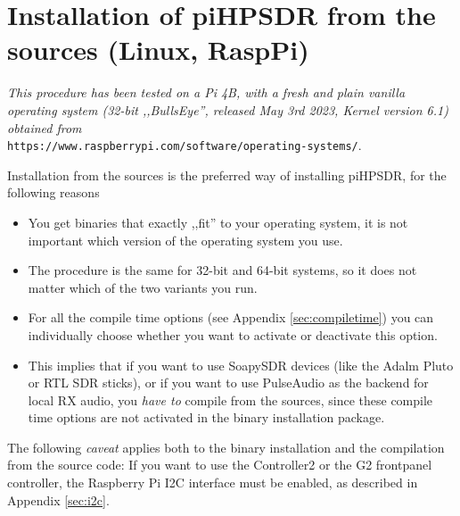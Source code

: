 \documentclass[12pt]{book}
\begin{document}
\chapter[Linux: piHPDSR install from sources]{Installation of piHPSDR from the sources (Linux, RaspPi)}
\label{sec:installsources}
\textit{This procedure has been tested on a Pi 4B, with a fresh and plain vanilla operating
system (32-bit ,,BullsEye'', released May 3rd 2023, Kernel version 6.1) obtained from} \\
\texttt{https://www.raspberrypi.com/software/operating-systems/}.

Installation from the sources is the preferred way of installing piHPSDR, for the following reasons

\begin{itemize}
\item{You get binaries that exactly ,,fit'' to your operating system, it is not important which version
of the operating system you use.}
\item{The procedure is the same for 32-bit and 64-bit systems, so it does not matter
which of the two variants you run.}
\item{For all the compile time options (see Appendix \ref{sec:compiletime}) you can individually choose
whether you want to activate or deactivate this option.}
\item{This implies that if you want to use SoapySDR devices (like the Adalm Pluto or RTL SDR sticks), or
if you want to use PulseAudio as the backend for local RX audio, you \textit{have to} compile from
the sources, since these compile time options are not activated in the binary installation package.}
\end{itemize}

The following \textit{caveat} applies both to the binary installation and the compilation from
the source code: If you want to use the Controller2 or the G2 frontpanel controller,
 the Raspberry Pi I2C interface
must be enabled, as described in Appendix \ref{sec:i2c}.

\begin{center}
\end{center}
\end{document}
